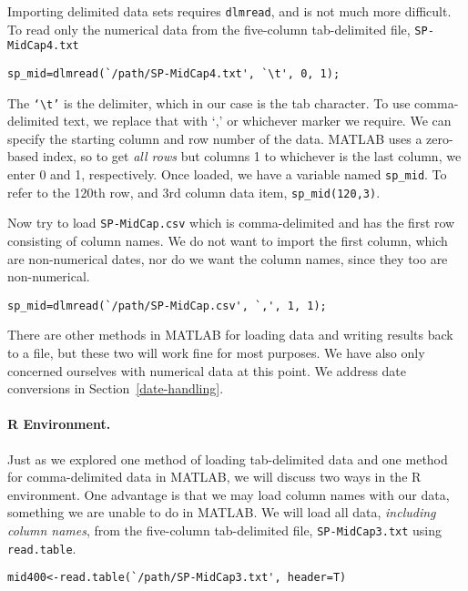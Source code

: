 Importing delimited data sets requires \texttt{dlmread}, and is not much more difficult. To read only the numerical data from the five-column  tab-delimited file, \texttt{SP-MidCap4.txt}
\begin{verbatim}
sp_mid=dlmread(`/path/SP-MidCap4.txt', `\t', 0, 1);
\end{verbatim}
The \texttt{`\textbackslash t'} is the delimiter, which in our case is the tab character. To use comma-delimited text, we replace that with `,' or whichever marker we require. We can specify the starting column and row number of the data. MATLAB uses a zero-based index, so to get \emph{all rows} but columns 1 to whichever is the last column, we enter 0 and 1, respectively. Once loaded, we have a variable named \texttt{sp\_mid}. To refer to the 120th row, and 3rd column data item, \texttt{sp\_mid(120,3)}.

Now try to load \texttt{SP-MidCap.csv} which is comma-delimited and has the first row consisting of column names. We do not want to import the first column, which are non-numerical dates, nor do we want the column names, since they too are non-numerical.
\begin{verbatim}
sp_mid=dlmread(`/path/SP-MidCap.csv', `,', 1, 1);
\end{verbatim}

There are other methods in MATLAB for loading data and writing results back to a file, but these two will work fine for most purposes. We have also only concerned ourselves with numerical data at this point. We address date conversions in Section~\ref{date-handling}.

\paragraph{R Environment.} Just as we explored one method of loading tab-delimited data and one method for comma-delimited data in MATLAB, we will discuss two ways in the R environment. One advantage is that we may load column names with our data, something we are unable to do in MATLAB. We will load all data, \emph{including column names}, from the five-column  tab-delimited file, \texttt{SP-MidCap3.txt} using \texttt{read.table}.
\begin{verbatim}
mid400<-read.table(`/path/SP-MidCap3.txt', header=T)
\end{verbatim}

